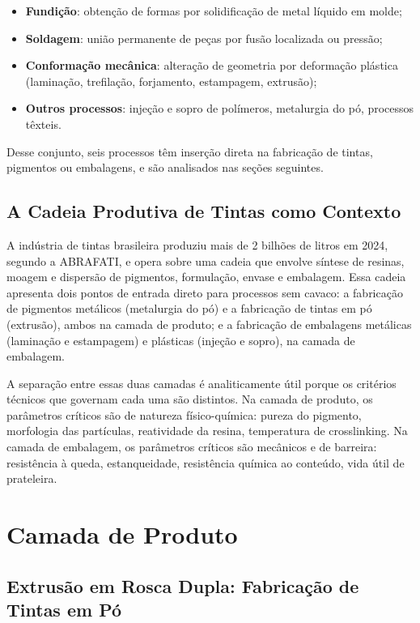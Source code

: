 \documentclass[
  12pt,
  a4paper,
  oneside,
  brazil,
  chapter=TITLE
]{article}
\newcommand{\secbreak}{\clearpage}
\let\oldsection\section
\renewcommand{\section}{\secbreak\oldsection}
\providecommand{\tightlist}{%
  \setlength{\itemsep}{0pt}\setlength{\parskip}{0pt}}
\begin{document}
\begin{itemize}
\tightlist
\item \textbf{Fundição}: obtenção de formas por solidificação de metal líquido em molde;
\item \textbf{Soldagem}: união permanente de peças por fusão localizada ou pressão;
\item \textbf{Conformação mecânica}: alteração de geometria por deformação plástica
  (laminação, trefilação, forjamento, estampagem, extrusão);
\item \textbf{Outros processos}: injeção e sopro de polímeros, metalurgia do pó,
  processos têxteis.
\end{itemize}

Desse conjunto, seis processos têm inserção direta na fabricação de tintas,
pigmentos ou embalagens, e são analisados nas seções seguintes.

\subsection{A Cadeia Produtiva de Tintas como Contexto}\label{cadeia-produtiva}

A indústria de tintas brasileira produziu mais de 2 bilhões de litros em 2024,
segundo a ABRAFATI, e opera sobre uma cadeia que envolve síntese de resinas,
moagem e dispersão de pigmentos, formulação, envase e embalagem. Essa cadeia
apresenta dois pontos de entrada direto para processos sem cavaco: a fabricação
de pigmentos metálicos (metalurgia do pó) e a fabricação de tintas em pó
(extrusão), ambos na camada de produto; e a fabricação de embalagens metálicas
(laminação e estampagem) e plásticas (injeção e sopro), na camada de embalagem.

A separação entre essas duas camadas é analiticamente útil porque os critérios
técnicos que governam cada uma são distintos. Na camada de produto, os parâmetros
críticos são de natureza físico-química: pureza do pigmento, morfologia das
partículas, reatividade da resina, temperatura de crosslinking. Na camada de
embalagem, os parâmetros críticos são mecânicos e de barreira: resistência à
queda, estanqueidade, resistência química ao conteúdo, vida útil de prateleira.

\section{Camada de Produto}\label{camada-produto}

\subsection{Extrusão em Rosca Dupla: Fabricação de Tintas em Pó}\label{extrusao}
\end{document}
